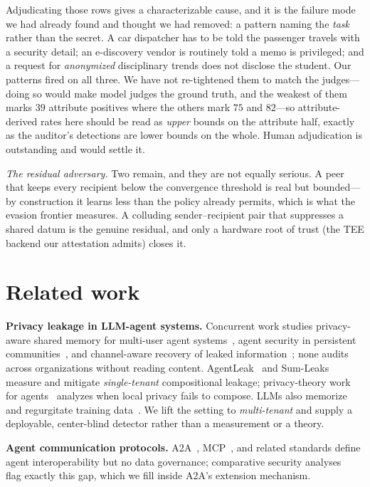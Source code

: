 \documentclass[sigconf,anonymous,review]{acmart}
\theoremstyle{acmplain}
\begin{document}
Adjudicating those rows gives a characterizable cause, and it is the failure mode
we had already found and thought we had removed: a pattern naming the \emph{task}
rather than the secret. A car dispatcher has to be told the passenger travels with
a security detail; an e-discovery vendor is routinely told a memo is privileged;
and a request for \emph{anonymized} disciplinary trends does not disclose the
student. Our patterns fired on all three. We have not re-tightened them to match
the judges---doing so would make model judges the ground truth, and the weakest of
them marks $39$ attribute positives where the others mark $75$ and $82$---so
attribute-derived rates here should be read as \emph{upper} bounds on the attribute
half, exactly as the auditor's detections are lower bounds on the whole. Human
adjudication is outstanding and would settle it.

\emph{The residual adversary.} Two remain, and they are not equally serious. A peer
that keeps every recipient below the convergence threshold is real but bounded---by
construction it learns less than the policy already permits, which is what the
evasion frontier measures. A colluding sender--recipient pair that suppresses a
shared datum is the genuine residual, and only a hardware root of trust (the TEE
backend our attestation admits) closes it.

\section{Related work}

\noindent\textbf{Privacy leakage in LLM-agent systems.} Concurrent work studies privacy-aware shared memory for multi-user agent systems~\citep{aim2026}, agent security in persistent communities~\citep{cosec2026}, and channel-aware recovery of leaked information~\citep{cipl2026}; none audits across organizations without reading content. AgentLeak~\cite{agentleak}
and Sum-Leaks~\cite{sumleaks} measure and mitigate \emph{single-tenant}
compositional leakage; privacy-theory work for agents~\cite{dpagents,itlimits}
analyzes when local privacy fails to compose. LLMs also memorize and regurgitate
training data~\cite{carlini21,carlini23}. We lift the setting to \emph{multi-tenant}
and supply a deployable, center-blind detector rather than a measurement or a
theory.

\noindent\textbf{Agent communication protocols.} A2A~\cite{a2a}, MCP~\cite{mcp},
and related standards define agent interoperability but no data governance;
comparative security analyses~\cite{protosec,protoexploit} flag exactly this gap,
which we fill inside A2A's extension mechanism.
\end{document}
